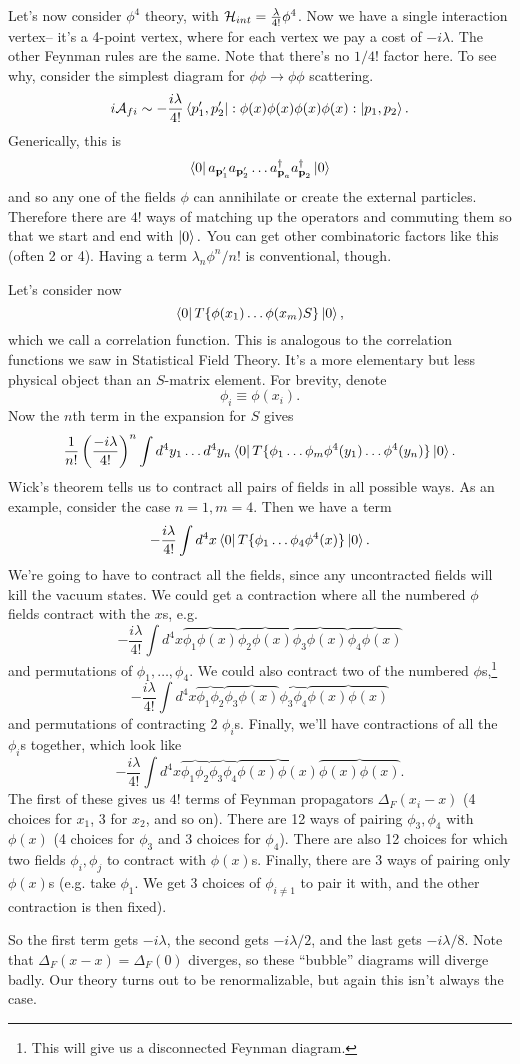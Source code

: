 Let's now consider $\phi^4$ theory, with $\mathcal H_{int}=\frac{\lambda}{4!} \phi^4$. Now we have a single interaction vertex-- it's a 4-point vertex, where for each vertex we pay a cost of $-i\lambda$. The other Feynman rules are the same. Note that there's no $1/4!$ factor here. To see why, consider the simplest diagram for $\phi\phi\to \phi \phi$ scattering.
$$i\mathcal{A}_{fi}\sim -\frac{i\lambda}{4!}\left< p_1',p_2' \right|:\phi(x)\phi(x)\phi(x)\phi(x):\left| p_1,p_2 \right>.$$ Generically, this is
$$\left< 0 \right|a_{\boldsymbol{\mathbf{p}}_1'}a_{\boldsymbol{\mathbf{p}}_2'}\ldots a_{\boldsymbol{\mathbf{p}}_a}^\dagger a_{\boldsymbol{\mathbf{p}}_2}^\dagger \left| 0 \right>$$
and so any one of the fields $\phi$ can annihilate or create the external particles. Therefore there are $4!$ ways of matching up the operators and commuting them so that we start and end with $\left| 0 \right>.$  You can get other combinatoric factors like this (often 2 or 4). Having a term $\lambda_n \phi^n/n!$ is conventional, though.

Let's consider now
$$\left< 0 \right|T\{\phi(x_1)\ldots \phi(x_m) S\}\left| 0 \right>,$$ which we call a correlation function. This is analogous to the correlation functions we saw in Statistical Field Theory. It's a more elementary but less physical object than an $S$-matrix element. For brevity, denote
$$\phi_i \equiv \phi(x_i).$$ Now the $n$th term in the expansion for $S$ gives
$$\frac{1}{n!}\left(\frac{-i\lambda}{4!}\right)^n\int d^4 y_1 \ldots d^4 y_n \left< 0 \right| T\{\phi_1 \ldots \phi_m \phi^4(y_1)\ldots \phi^4(y_n)\}\left| 0 \right>.$$
Wick's theorem tells us to contract all pairs of fields in all possible ways. As an example, consider the case $n=1,m=4$.
Then we have a term
$$-\frac{i\lambda}{4!}\int d^4x \left< 0 \right|T\{\phi_1 \ldots \phi_4 \phi^4(x)\}\left| 0 \right>.$$
We're going to have to contract all the fields, since any uncontracted fields will kill the vacuum states. We could get a contraction where all the numbered $\phi$ fields contract with the $x$s, e.g.
$$-\frac{i\lambda}{4!}\int d^4 x \overbrace{\phi_1 \phi(x)}\overbrace{\phi_2 \phi(x)} \overbrace{\phi_3\phi(x)}\overbrace{\phi_4\phi(x)}$$
and permutations of $\phi_1,\ldots,\phi_4.$ We could also contract two of the numbered $\phi$s,\footnote{This will give us a disconnected Feynman diagram.}
$$-\frac{i\lambda}{4!} \int d^4x \overbrace{\phi_1 \phi_2} \overbrace{\phi_3 \phi(x)} \overbrace{\phi_3 \phi_4} \overbrace{\phi(x)\phi(x)}$$
and permutations of contracting 2 $\phi_i$s. Finally, we'll have contractions of all the $\phi_i$s together, which look like
$$-\frac{i\lambda}{4!}\int d^4x \overbrace{\phi_1\phi_2} \overbrace{\phi_3\phi_4} \overbrace{\phi(x)\phi(x)}\overbrace{\phi(x)\phi(x)}.$$
The first of these gives us $4!$ terms of Feynman propagators $\Delta_F (x_i-x)$ (4 choices for $x_1$, $3$ for $x_2$, and so on). There are 12 ways of pairing $\phi_3,\phi_4$ with $\phi(x)$ (4 choices for $\phi_3$ and $3$ choices for $\phi_4$). There are also 12 choices for which two fields $\phi_i,\phi_j$ to contract with $\phi(x)$s. Finally, there are $3$ ways of pairing only $\phi(x)$s (e.g. take $\phi_1$. We get 3 choices of $\phi_{i\neq 1}$ to pair it with, and the other contraction is then fixed).

So the first term gets $-i\lambda$, the second gets $-i\lambda/2$, and the last gets $-i\lambda/8$. Note that $\Delta_F(x-x)=\Delta_F(0)$ diverges, so these ``bubble'' diagrams will diverge badly. Our theory turns out to be renormalizable, but again this isn't always the case.